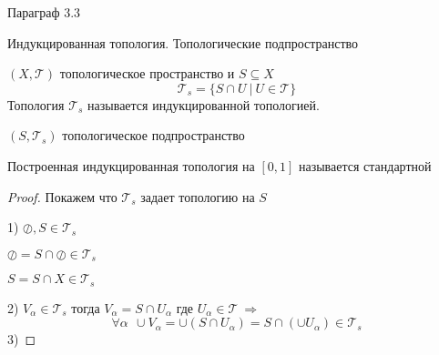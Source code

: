 \begin{title}[\Large]
  Параграф 3.3
\end{title}

\begin{title}[\Large]
  Индукцированная топология. Топологические подпространство
\end{title}

\begin{define}
  $(X, \mathcal{T})$ топологическое пространство и $S \subseteq X$
  $$
  \mathcal{T}_s = \{ S \cap U ~ | ~ U \in \mathcal{T} \}
  $$
  Топология $\mathcal{T}_s$ называется индукцированной топологией.

  $(S, \mathcal{T}_s)$ топологическое подпространство

  Построенная индукцированная топология на $[0,1]$ называется стандартной
\end{define}

\begin{proof}
  Покажем что $\mathcal{T}_s$ задает топологию на $S$

  1) $\oslash, S \in \mathcal{T}_s$

  $\oslash = S \cap \oslash \in \mathcal{T}_s$

  $S = S \cap X \in \mathcal{T}_s$

  2) $V_{\alpha} \in \mathcal{T}_s$ тогда
  $V_{\alpha} = S \cap U_{\alpha}$ где $U_{\alpha} \in \mathcal{T} ~
  \Rightarrow$
  $$
  \forall \alpha ~~ \cup V_{\alpha} =
  \cup(S \cap U_{\alpha}) = S \cap (\cup U_{\alpha}) \in \mathcal{T}_s
  $$
  3)
\end{proof}

